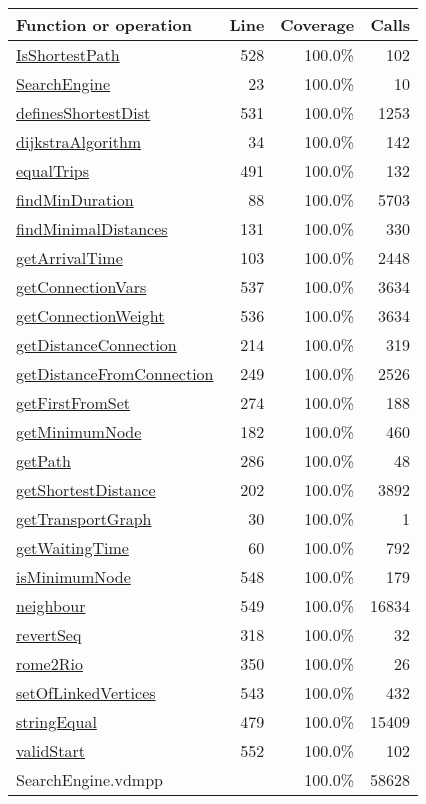 \begin{longtable}{|l|r|r|r|}
\hline
Function or operation & Line & Coverage & Calls \\
\hline
\hline
\hyperref[IsShortestPath:528]{IsShortestPath} & 528&100.0\% & 102 \\
\hline
\hyperref[SearchEngine:23]{SearchEngine} & 23&100.0\% & 10 \\
\hline
\hyperref[definesShortestDist:531]{definesShortestDist} & 531&100.0\% & 1253 \\
\hline
\hyperref[dijkstraAlgorithm:34]{dijkstraAlgorithm} & 34&100.0\% & 142 \\
\hline
\hyperref[equalTrips:491]{equalTrips} & 491&100.0\% & 132 \\
\hline
\hyperref[findMinDuration:88]{findMinDuration} & 88&100.0\% & 5703 \\
\hline
\hyperref[findMinimalDistances:131]{findMinimalDistances} & 131&100.0\% & 330 \\
\hline
\hyperref[getArrivalTime:103]{getArrivalTime} & 103&100.0\% & 2448 \\
\hline
\hyperref[getConnectionVars:537]{getConnectionVars} & 537&100.0\% & 3634 \\
\hline
\hyperref[getConnectionWeight:536]{getConnectionWeight} & 536&100.0\% & 3634 \\
\hline
\hyperref[getDistanceConnection:214]{getDistanceConnection} & 214&100.0\% & 319 \\
\hline
\hyperref[getDistanceFromConnection:249]{getDistanceFromConnection} & 249&100.0\% & 2526 \\
\hline
\hyperref[getFirstFromSet:274]{getFirstFromSet} & 274&100.0\% & 188 \\
\hline
\hyperref[getMinimumNode:182]{getMinimumNode} & 182&100.0\% & 460 \\
\hline
\hyperref[getPath:286]{getPath} & 286&100.0\% & 48 \\
\hline
\hyperref[getShortestDistance:202]{getShortestDistance} & 202&100.0\% & 3892 \\
\hline
\hyperref[getTransportGraph:30]{getTransportGraph} & 30&100.0\% & 1 \\
\hline
\hyperref[getWaitingTime:60]{getWaitingTime} & 60&100.0\% & 792 \\
\hline
\hyperref[isMinimumNode:548]{isMinimumNode} & 548&100.0\% & 179 \\
\hline
\hyperref[neighbour:549]{neighbour} & 549&100.0\% & 16834 \\
\hline
\hyperref[revertSeq:318]{revertSeq} & 318&100.0\% & 32 \\
\hline
\hyperref[rome2Rio:350]{rome2Rio} & 350&100.0\% & 26 \\
\hline
\hyperref[setOfLinkedVertices:543]{setOfLinkedVertices} & 543&100.0\% & 432 \\
\hline
\hyperref[stringEqual:479]{stringEqual} & 479&100.0\% & 15409 \\
\hline
\hyperref[validStart:552]{validStart} & 552&100.0\% & 102 \\
\hline
\hline
SearchEngine.vdmpp & & 100.0\% & 58628 \\
\hline
\end{longtable}

